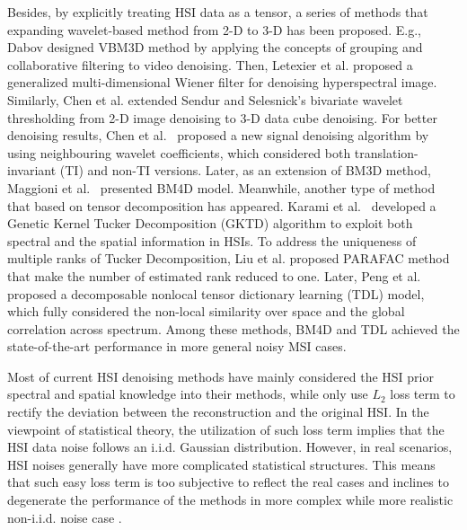 \documentclass[journal]{IEEEtran}
\begin{document}
Besides, by explicitly treating HSI data as a tensor, a series of methods that expanding wavelet-based method from 2-D to 3-D has been proposed. E.g., Dabov \cite{dabov2007video} designed VBM3D method by applying the concepts of grouping and collaborative filtering to video denoising. Then, Letexier et al.  \cite{letexier2008noise} proposed a generalized multi-dimensional Wiener filter for denoising hyperspectral image. Similarly, Chen et al.\cite{chen2011denoising} extended Sendur and Selesnick's bivariate wavelet thresholding from 2-D image denoising to 3-D data cube denoising.  For better denoising results, Chen et al.~\cite{chen2012signal} proposed a new signal denoising algorithm  by using neighbouring wavelet coefficients, which considered both translation-invariant (TI) and non-TI versions.  Later, as an extension of BM3D method, Maggioni et al.~\cite{BM4D2013TIP} presented BM4D model.
Meanwhile, another type of method that based on tensor decomposition  has appeared.  Karami et al.~\cite{karami2011noise}  developed a Genetic Kernel Tucker Decomposition (GKTD) algorithm to exploit both spectral and the spatial information in HSIs. To address the uniqueness of multiple ranks of Tucker Decomposition, Liu et al. \cite{liu2012denoising} proposed PARAFAC method that make  the number of estimated rank reduced to one. Later, Peng et al.~\cite{peng2014decomposable} proposed a decomposable nonlocal tensor dictionary learning (TDL) model, which fully considered the non-local similarity over space and the global correlation across spectrum. Among these methods, BM4D and TDL achieved the state-of-the-art performance in more general noisy MSI cases.

Most of current HSI denoising methods have mainly considered the HSI prior spectral and spatial knowledge into their methods, while only use $L_2$ loss term to rectify the deviation between the reconstruction and the original HSI. In the viewpoint of statistical theory, the utilization of such loss term implies that the HSI data noise follows an i.i.d. Gaussian distribution. However, in real scenarios, HSI noises generally have more complicated statistical structures. This means that such easy loss term is too subjective to reflect the real cases and inclines to degenerate the performance of the methods in more complex while more realistic non-i.i.d. noise case .
%
\end{document}
